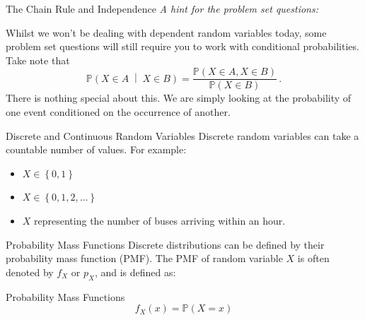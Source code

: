 \documentclass[10pt]{beamer}
\begin{document}
\begin{frame}[fragile]{The Chain Rule and Independence}
\textit{A hint for the problem set questions:}

Whilst we won't be dealing with dependent random variables today, some problem set questions will still require you to work with conditional probabilities. Take note that
\begin{equation*}
    \mathbb{P}\left(X \in A \;\middle|\; X \in B\right) = \frac{\mathbb{P}\left(X \in A, X \in B\right)}{\mathbb{P}\left(X \in B\right)}\,.
\end{equation*}
There is nothing special about this. We are simply looking at the probability of one event conditioned on the occurrence of another.
\end{frame}

\begin{frame}[fragile]{Discrete and Continuous Random Variables}
Discrete random variables can take a countable number of values. For example:
\begin{itemize}
    \item \(X \in \left\{0, 1\right\}\)
    \item \(X \in \left\{0, 1, 2, \dots\right\}\)
    \item \(X\) representing the number of buses arriving within an hour.
\end{itemize}

\end{frame}

\begin{frame}[fragile]{Probability Mass Functions}
Discrete distributions can be defined by their probability mass function (PMF). The PMF of random variable \(X\) is often denoted by \(f_X\) or \(p_X\), and is defined as:
\begin{alertblock}{Probability Mass Functions}
\begin{equation*}
    f_X\left(x\right) = \mathbb{P}\left(X = x\right)
\end{equation*}
\end{alertblock}
\end{frame}
\end{document}
